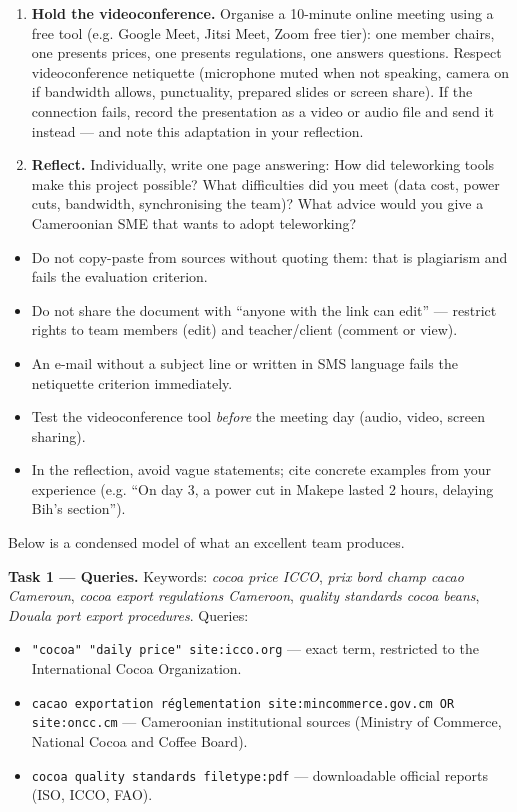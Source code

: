 \documentclass[11pt]{article}
\newcommand{\cle}[1]{{\popxbold\color{popdark}#1}}
\newcounter{popsec}
\newcounter{popsub}
\newcommand{\courssub}[1]{%
  \stepcounter{popsub}%
  \par\vspace{9pt}\noindent{\popxbold\fontsize{11.5}{13}\selectfont\color{popink}{\color{poporange}\thepopsec.\thepopsub}\hspace{6pt}#1}\par\nopagebreak\vspace{4pt}
}
\begin{document}
\begin{enumerate}
\item \textbf{Hold the videoconference.} Organise a 10-minute online meeting using a free tool (e.g. Google Meet, Jitsi Meet, Zoom free tier): one member chairs, one presents prices, one presents regulations, one answers questions. Respect videoconference netiquette (microphone muted when not speaking, camera on if bandwidth allows, punctuality, prepared slides or screen share). If the connection fails, record the presentation as a video or audio file and send it instead — and note this adaptation in your reflection.
\item \textbf{Reflect.} Individually, write one page answering: How did teleworking tools make this project possible? What difficulties did you meet (data cost, power cuts, bandwidth, synchronising the team)? What advice would you give a Cameroonian SME that wants to adopt teleworking?
\end{enumerate}

\begin{attention}
\begin{itemize}
\item Do not copy-paste from sources without quoting them: that is \cle{plagiarism} and fails the evaluation criterion.
\item Do not share the document with ``anyone with the link can edit'' — restrict rights to team members (edit) and teacher/client (comment or view).
\item An e-mail without a subject line or written in SMS language fails the netiquette criterion immediately.
\item Test the videoconference tool \emph{before} the meeting day (audio, video, screen sharing).
\item In the reflection, avoid vague statements; cite concrete examples from your experience (e.g. ``On day 3, a power cut in Makepe lasted 2 hours, delaying Bih's section'').
\end{itemize}
\end{attention}

\courssub{Model answer}

Below is a condensed model of what an excellent team produces.

\textbf{Task 1 — Queries.} Keywords: \emph{cocoa price ICCO}, \emph{prix bord champ cacao Cameroun}, \emph{cocoa export regulations Cameroon}, \emph{quality standards cocoa beans}, \emph{Douala port export procedures}. Queries:
\begin{itemize}
\item \texttt{"cocoa" "daily price" site:icco.org} — exact term, restricted to the International Cocoa Organization.
\item \texttt{cacao exportation réglementation site:mincommerce.gov.cm OR site:oncc.cm} — Cameroonian institutional sources (Ministry of Commerce, National Cocoa and Coffee Board).
\item \texttt{cocoa quality standards filetype:pdf} — downloadable official reports (ISO, ICCO, FAO).
\end{itemize}
\end{document}

